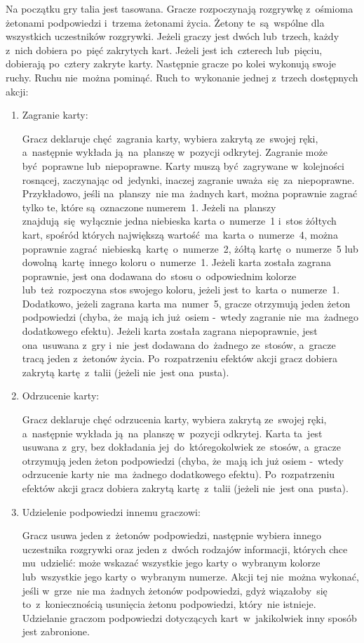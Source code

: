\documentclass[declaration,shortabstract,inz]{iithesis}
\begin{document}
Na początku gry talia jest tasowana. Gracze rozpoczynają rozgrywkę z~ośmioma żetonami podpowiedzi i~trzema żetonami życia. Żetony te~są~wspólne dla wszystkich uczestników rozgrywki. Jeżeli graczy jest dwóch lub~trzech, każdy z~nich dobiera po~pięć zakrytych kart. Jeżeli jest ich~czterech lub~pięciu, dobierają po~cztery zakryte karty. Następnie gracze po kolei wykonują swoje ruchy. Ruchu nie~można pominąć. Ruch to~wykonanie jednej z~trzech dostępnych akcji:
\begin{enumerate}
	\item Zagranie karty:

	Gracz deklaruje chęć zagrania karty, wybiera zakrytą ze~swojej ręki, a~następnie wykłada ją~na~planszę w~pozycji odkrytej. Zagranie może być~poprawne lub~niepoprawne. Karty muszą być~zagrywane w~kolejności rosnącej, zaczynając od~jedynki, inaczej zagranie uważa~się za~niepoprawne. Przykładowo, jeśli na~planszy~nie ma~żadnych kart, można poprawnie zagrać tylko te, które są~oznaczone numerem~1. Jeżeli na~planszy znajdują~się wyłącznie jedna niebieska karta o~numerze~1 i~stos żółtych kart, spośród których największą wartość ma~karta o~numerze~4, można poprawnie zagrać niebieską kartę o~numerze~2, żółtą kartę o~numerze~5 lub dowolną kartę innego koloru o~numerze~1. Jeżeli karta została zagrana poprawnie, jest ona dodawana do~stosu o~odpowiednim kolorze lub~też~rozpoczyna stos swojego koloru, jeżeli jest to~karta o~numerze~1. Dodatkowo, jeżeli zagrana karta ma~numer~5, gracze otrzymują jeden żeton podpowiedzi (chyba, że~mają ich już osiem -~wtedy zagranie nie~ma~żadnego dodatkowego efektu). Jeżeli karta została zagrana niepoprawnie, jest ona~usuwana z~gry i~nie~jest dodawana do~żadnego ze~stosów, a~gracze tracą jeden z~żetonów życia. Po~rozpatrzeniu efektów akcji gracz dobiera zakrytą kartę z~talii (jeżeli nie~jest ona~pusta).
	
	\item Odrzucenie karty:
 
	Gracz deklaruje chęć odrzucenia karty, wybiera zakrytą ze~swojej ręki, a~następnie wykłada ją~na~planszę w~pozycji odkrytej. Karta ta~jest usuwana z~gry, bez dokładania jej~do~któregokolwiek ze~stosów, a~gracze otrzymują jeden żeton podpowiedzi (chyba, że~mają ich już osiem -~wtedy odrzucenie karty nie~ma~żadnego dodatkowego efektu). Po~rozpatrzeniu efektów akcji gracz dobiera zakrytą kartę z~talii (jeżeli nie~jest ona~pusta).

	\item Udzielenie podpowiedzi innemu graczowi:

	Gracz usuwa jeden z~żetonów podpowiedzi, następnie wybiera innego uczestnika rozgrywki oraz jeden z~dwóch rodzajów informacji, których chce mu~udzielić: może wskazać wszystkie jego karty o~wybranym kolorze lub~wszystkie jego karty o~wybranym numerze. Akcji tej nie~można wykonać, jeśli w~grze~nie ma~żadnych żetonów podpowiedzi, gdyż wiązałoby~się to~z~koniecznością usunięcia żetonu podpowiedzi, który~nie istnieje. Udzielanie graczom podpowiedzi dotyczących kart w~jakikolwiek inny sposób jest zabronione.
\end{enumerate}
\end{document}

